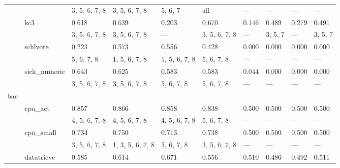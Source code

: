 \documentclass{article}
\begin{document}
\begin{center}
\begin{longtable}{p{1.2cm}p{1.8cm}p{1cm}p{1cm}p{1cm}p{1cm}p{1cm}p{1cm}p{1cm}p{1cm}}
             &              & 3, 5, 6, 7, 8    & 3, 5, 6, 7, 8    & 5, 6, 7          & all              & ---        & ---           & ---           & ---           \\
             & kc3          & 0.618            & 0.639            & 0.203            & 0.670            & 0.146      & 0.489         & 0.279         & 0.491         \\
             &              & 3, 5, 6, 7, 8    & 3, 5, 6, 7, 8    & ---              & 3, 5, 6, 7, 8    & ---        & 3, 5, 7       & ---           & 3, 5, 7       \\
             & schlvote     & 0.223            & 0.573            & 0.556            & 0.428            & 0.000      & 0.000         & 0.000         & 0.000         \\
             &              & 5, 6, 7, 8       & 1, 5, 6, 7, 8    & 1, 5, 6, 7, 8    & 5, 6, 7, 8       & ---        & ---           & ---           & ---           \\
             & sick\_numeric & 0.643            & 0.625            & 0.583            & 0.583            & 0.044      & 0.000         & 0.000         & 0.000         \\
             &              & 3, 5, 6, 7, 8    & 3, 5, 6, 7, 8    & 5, 6, 7, 8       & 5, 6, 7, 8       & ---        & ---           & ---           & ---           \\
 bac         &              &                  &                  &                  &                  &            &               &               &               \\
             & cpu\_act      & 0.857            & 0.866            & 0.858            & 0.838            & 0.500      & 0.500         & 0.500         & 0.500         \\
             &              & 4, 5, 6, 7, 8    & 4, 5, 6, 7, 8    & 4, 5, 6, 7, 8    & 5, 6, 7, 8       & ---        & ---           & ---           & ---           \\
             & cpu\_small    & 0.734            & 0.750            & 0.713            & 0.738            & 0.500      & 0.500         & 0.500         & 0.500         \\
             &              & 3, 5, 6, 7, 8    & 1, 3, 5, 6, 7, 8 & 5, 6, 7, 8       & 3, 5, 6, 7, 8    & ---        & ---           & ---           & ---           \\
             & datatrieve   & 0.585            & 0.614            & 0.671            & 0.556            & 0.510      & 0.486         & 0.492         & 0.511         \\

\end{longtable}
\end{center}
\end{document}
